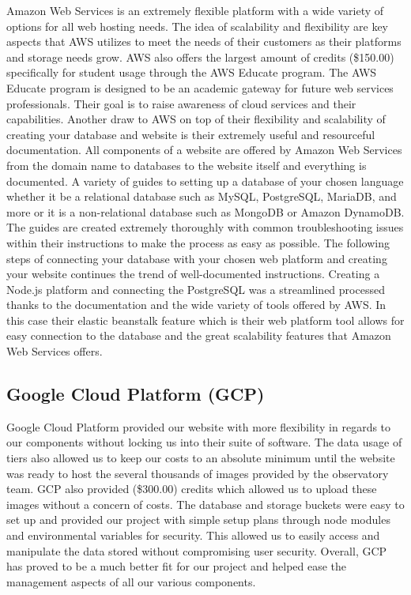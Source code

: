\documentclass[12pt]{article}
\begin{document}
Amazon Web Services is an extremely flexible platform with a wide variety of options for all web hosting needs.  The idea of scalability and flexibility are key aspects that AWS utilizes to meet the needs of their customers as their platforms and storage needs grow.  AWS also offers the largest amount of credits (\$150.00) specifically for student usage through the AWS Educate program.\cite{aws}  The AWS Educate program is designed to be an academic gateway for future web services professionals.  Their goal is to raise awareness of cloud services and their capabilities.
Another draw to AWS on top of their flexibility and scalability of creating your database and website is their extremely useful and resourceful documentation.  All components of a website are offered by Amazon Web Services from the domain name to databases to the website itself and everything is documented.  A variety of guides to setting up a database of your chosen language whether it be a relational database such as MySQL, PostgreSQL, MariaDB, and more or it is a non-relational database such as MongoDB or Amazon DynamoDB.  The guides are created extremely thoroughly with common troubleshooting issues within their instructions to make the process as easy as possible.
The following steps of connecting your database with your chosen web platform and creating your website continues the trend of well-documented instructions.  Creating a Node.js platform and connecting the PostgreSQL was a streamlined processed thanks to the documentation and the wide variety of tools offered by AWS.  In this case their elastic beanstalk feature which is their web platform tool allows for easy connection to the database and the great scalability features that Amazon Web Services offers.

\subsection{Google Cloud Platform (GCP)}

Google Cloud Platform provided our website with more flexibility in regards to our components without locking us into their suite of software.  The data usage of tiers also allowed us to keep our costs to an absolute minimum until the website was ready to host the several thousands of images provided by the observatory team.  GCP also provided (\$300.00) credits which allowed us to upload these images without a concern of costs.  The database and storage buckets were easy to set up and provided our project with simple setup plans through node modules and environmental variables for security.  This allowed us to easily access and manipulate the data stored without compromising user security.  Overall, GCP has proved to be a much better fit for our project and helped ease the management aspects of all our various components.
\end{document}
